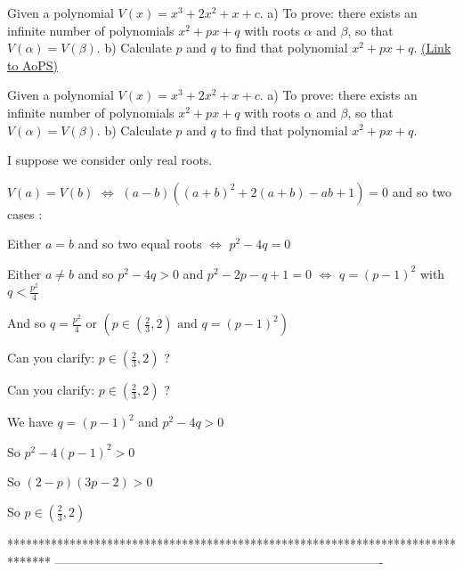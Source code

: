 \begin{problem}
	Given a polynomial $V(x) = x^{3}+2x^{2}+x+ c $.
a) To prove: there exists an infinite number of polynomials $x^{2}+p x +q$ with roots $\alpha$ and $\beta$, so that $V(\alpha)=V(\beta)$.
b) Calculate $p$ and $q$ to find that polynomial $x^{2}+p x +q$.
	\flushright \href{https://artofproblemsolving.com/community/c6h468092}{(Link to AoPS)}
\end{problem}



\begin{solution}
	\begin{tcolorbox}Given a polynomial $V(x) = x^{3}+2x^{2}+x+ c $.
a) To prove: there exists an infinite number of polynomials $x^{2}+p x +q$ with roots $\alpha$ and $\beta$, so that $V(\alpha)=V(\beta)$.
b) Calculate $p$ and $q$ to find that polynomial $x^{2}+p x +q$.\end{tcolorbox}
I suppose we consider only real roots.

$V(a)=V(b)$ $\iff$ $(a-b)((a+b)^2+2(a+b)-ab+1)=0$ and so two cases :

Either $a=b$ and so two equal roots $\iff$ $p^2-4q=0$

Either $a\ne b$ and so $p^2-4q>0$ and $p^2-2p-q+1=0$ $\iff$ $q=(p-1)^2$ with $q<\frac{p^2}4$

And so $\boxed{q=\frac {p^2}4\text{ or }\left(p\in(\frac 23,2)\text{ and }q=(p-1)^2\right)}$
\end{solution}



\begin{solution}
	Can you clarify: $p\in(\frac{2}{3},2) $ ?
\end{solution}



\begin{solution}
	\begin{tcolorbox}Can you clarify: $p\in(\frac{2}{3},2) $ ?\end{tcolorbox}
We have $q=(p-1)^2$ and $p^2-4q>0$ 

So $p^2-4(p-1)^2>0$

So $(2-p)(3p-2)>0$

So $p\in(\frac 23,2)$
\end{solution}
*******************************************************************************
-------------------------------------------------------------------------------

